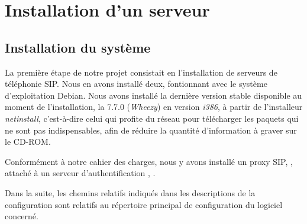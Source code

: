 \section{Installation d’un serveur}

\subsection{Installation du système}

La première étape de notre projet consistait en l’installation de serveurs de téléphonie SIP. Nous en avons installé deux, fontionnant avec le système d’exploitation Debian. Nous avons installé la dernière version stable disponible au moment de l’installation, la 7.7.0 (\textit{Wheezy}) en version \textit{i386}, à partir de l’installeur \textit{netinstall}, c’est-à-dire celui qui profite du réseau pour télécharger les paquets qui ne sont pas indispensables, afin de réduire la quantité d’information à graver sur le CD-ROM.

Conformément à notre cahier des charges, nous y avons installé un proxy SIP, {\kam}, attaché à un serveur d’authentification {\rad}, {\frad}.

Dans la suite, les chemins relatifs indiqués dans les descriptions de la configuration sont relatifs au répertoire principal de configuration du logiciel concerné.

\newpage


\newpage

